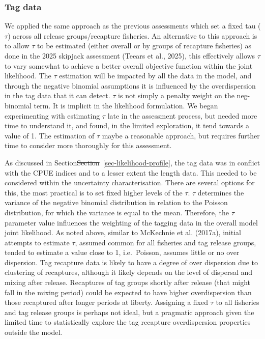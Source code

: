 \documentclass[
  english,
  a4paper,
  a4paper,
  11pt]{SCreport}
\providecommand{\DIFdel}[1]{{\protect\color{red}\sout{#1}}}                      %
\providecommand{\DIFdelbegin}{} %
\providecommand{\DIFdelend}{} %
\newcommand{\DIFscaledelfig}{0.5}
\newlength{\DIFdelgraphicswidth} %
\newlength{\DIFdelgraphicsheight} %
\newcommand{\DIFdelincludegraphics}[2][]{%
\sbox{\DIFdelgraphicsbox}{\DIFOincludegraphics[#1]{#2}}%
\settoboxwidth{\DIFdelgraphicswidth}{\DIFdelgraphicsbox} %
\settoboxtotalheight{\DIFdelgraphicsheight}{\DIFdelgraphicsbox} %
\scalebox{\DIFscaledelfig}{%
\parbox[b]{\DIFdelgraphicswidth}{\usebox{\DIFdelgraphicsbox}\\[-\baselineskip] \rule{\DIFdelgraphicswidth}{0em}}\llap{\resizebox{\DIFdelgraphicswidth}{\DIFdelgraphicsheight}{%
\setlength{\unitlength}{\DIFdelgraphicswidth}%
\begin{picture}(1,1)%
\thicklines\linethickness{2pt} %
{\color[rgb]{1,0,0}\put(0,0){\framebox(1,1){}}}%
{\color[rgb]{1,0,0}\put(0,0){\line( 1,1){1}}}%
{\color[rgb]{1,0,0}\put(0,1){\line(1,-1){1}}}%
\end{picture}%
}\hspace*{3pt}}} %
} %
\DeclareRobustCommand{\DIFdelbegin}{\DIFOdelbegin \let\includegraphics\DIFdelincludegraphics} %
\DeclareRobustCommand{\DIFdelend}{\DIFOaddend \let\includegraphics\DIFOincludegraphics} %
\begin{document}
\subsubsection{Tag data}\label{sec-tagdata-likelihood}

We applied the same approach as the previous assessments which set a
fixed tau (\(\tau\)) across all release groups/recapture fisheries. An
alternative to this approach is to allow \(\tau\) to be estimated
(either overall or by groups of recapture fisheries) as done in the 2025
skipjack assessment (Teears et al., 2025), this effectively allows
\(\tau\) to vary somewhat to achieve a better overall objective function
within the joint likelihood. The \(\tau\) estimation will be impacted by
all the data in the model, and through the negative binomial assumptions
it is influenced by the overdispersion in the tag data that it can
detect. \(\tau\) is not simply a penalty weight on the neg-binomial
term. It is implicit in the likelihood formulation. We began
experimenting with estimating \(\tau\) late in the assessment process,
but needed more time to understand it, and found, in the limited
exploration, it tend towards a value of 1. The estimation of \(\tau\)
maybe a reasonable approach, but requires further time to consider more
thoroughly for this assessment.

As discussed in Section\DIFdelbegin \DIFdel{Section}\DIFdelend ~\ref{sec-likelihood-profile}, the tag data was
in conflict with the CPUE indices and to a lesser extent the length
data. This needed to be considered within the uncertainty
characterisation. There are several options for this, the most practical
is to set fixed higher levels of the \(\tau\). \(\tau\) determines the
variance of the negative binomial distribution in relation to the
Poisson distribution, for which the variance is equal to the mean.
Therefore, the \(\tau\) parameter value influences the weighting of the
tagging data in the overall model joint likelihood. As noted above,
similar to McKechnie et al. (2017a), initial attempts to estimate
\(\tau\), assumed common for all fisheries and tag release groups,
tended to estimate a value close to 1, i.e.~Poisson, assumes little or
no over dispersion. Tag recapture data is likely to have a degree of
over dispersion due to clustering of recaptures, although it likely
depends on the level of dispersal and mixing after release. Recaptures
of tag groups shortly after release (that might fall in the mixing
period) could be expected to have higher overdispersion than those
recaptured after longer periods at liberty. Assigning a fixed \(\tau\)
to all fisheries and tag release groups is perhaps not ideal, but a
pragmatic approach given the limited time to statistically explore the
tag recapture overdispersion properties outside the model.
\end{document}
